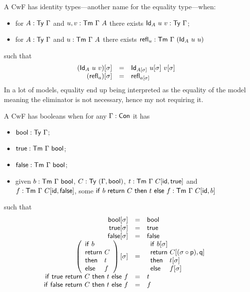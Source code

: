 
A \acrshort{CwF} has identity types---another name for the equality type---when:
\begin{itemize}
  \item for \(A : \mathsf{Ty}\ \Gamma\) and \(u, v : \mathsf{Tm}\ \Gamma\ A\) there exists
  \(\mathsf{Id}_A\ u\ v : \mathsf{Ty}\ \Gamma\);
  \item for \(A : \mathsf{Ty}\ \Gamma\) and \(u : \mathsf{Tm}\ \Gamma\ A\) there exists
  \(\crefl_u : \CTm\ \Ga\ (\CId_A\ u\ u)\)
\end{itemize}
such that
\[
  \begin{array}{rcl}
    (\CId_A\ u\ v)[\sigma] &=& \CId_{A[\sigma]}\ u[\sigma]\ v[\sigma] \\
    (\crefl_a)[\sigma] &=& \crefl_{a[\sigma]}
  \end{array}
\]
In a lot of models, equality end up being interpreted as the equality of the
model meaning the eliminator is not necessary, hence my not requiring it.


A \acrshort{CwF} has booleans when for any \(\Gamma : \mathsf{Con}\) it has
\begin{itemize}
  \item \(\mathsf{bool} : \mathsf{Ty}\ \Gamma\);
  \item \(\ttrue : \CTm\ \Ga\ \bool\);
  \item \(\ffalse : \CTm\ \Ga\ \bool\);
  \item given \(b : \mathsf{Tm}\ \Gamma\ \mathsf{bool}\), \(C : \mathsf{Ty}\ (\Gamma, \mathsf{bool})\),
  \(t : \mathsf{Tm}\ \Gamma\ C[\mathsf{id}, \mathsf{true}]\) and \(f : \mathsf{Tm}\ \Gamma\ C[\mathsf{id}, \mathsf{false}]\),
  some \(\mathsf{if}\ b\ \mathsf{return}\ C\ \mathsf{then}\ t\ \mathsf{else}\ f : \mathsf{Tm}\ \Gamma\ C[\mathsf{id}, b]\)
\end{itemize}
such that
\[
  \begin{array}{rcl}
    \bool[\sigma] &=& \bool \\
    \ttrue[\sigma] &=& \ttrue \\
    \ffalse[\sigma] &=& \ffalse \\
    \left(\fitif{b}{C}{t}{f}\right)[\sigma] &=&
    \fitif{b[\sigma]}{C[(\sigma \circ \pp), \pq]}{t[\sigma]}{f[\sigma]} \\
    \tif{\ttrue}{C}{t}{f} &=& t \\
    \tif{\ffalse}{C}{t}{f} &=& f
  \end{array}
\]


